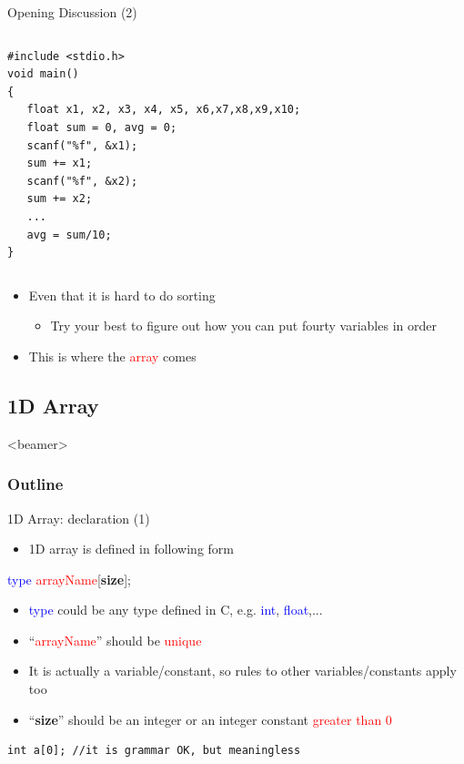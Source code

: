 \begin{frame}[fragile]{Opening Discussion (2)}
\vspace{-0.15in}
\begin{columns}
\begin{column}{0.75\linewidth}
\begin{lstlisting}
#include <stdio.h>
void main()
{
   float x1, x2, x3, x4, x5, x6,x7,x8,x9,x10;
   float sum = 0, avg = 0;
   scanf("%f", &x1);
   sum += x1;
   scanf("%f", &x2);
   sum += x2;
   ...
   avg = sum/10;
}

\end{lstlisting}
\end{column}
\end{columns}
\vspace{-0.15in}
\begin{itemize}
	\item {Even that it is hard to do sorting}
	\begin{itemize}
		\item {Try your best to figure out how you can put fourty variables in order}
	\end{itemize}
	\item {This is where the \textcolor{red}{array} comes}
\end{itemize}

\end{frame}

\subsection{1D Array}
\label{sec:1darry}
\begin{frame}<beamer>
    \frametitle{Outline}
\end{frame}

\begin{frame}[fragile]{1D Array: declaration (1)}
\begin{itemize}
	\item {1D array is defined in following form}
\end{itemize}
\begin{center}
 \LARGE{
	\textcolor{blue}{type} \textcolor{red}{arrayName}[\textbf{size}];
	}
\end{center}
\begin{itemize}
	\item {\textcolor{blue}{type} could be any type defined in C, e.g. \textcolor{blue}{int}, \textcolor{blue}{float},...}
	\item {``\textcolor{red}{arrayName}'' should be \textcolor{red}{unique}}
	\item {It is actually a variable/constant, so rules to other variables/constants apply too}
	\item {``\textbf{size}'' should be an integer or an integer constant \textcolor{red}{greater than 0}}
\end{itemize}
\begin{lstlisting}[xleftmargin=0.09\linewidth, linewidth=0.9\linewidth, frame=no, numbers=none]
int a[0]; //it is grammar OK, but meaningless
\end{lstlisting}
\end{frame}

